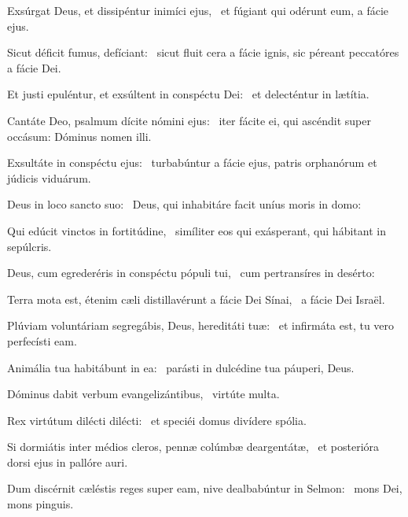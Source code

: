 \item Exsúrgat Deus, et dissipéntur inimíci ejus,~\psstar{} et fúgiant qui odérunt eum, a fácie ejus.

\item Sicut déficit fumus, defíciant:~\psstar{} sicut fluit cera a fácie ignis, sic péreant peccatóres a fácie Dei.

\item Et justi epuléntur, et exsúltent in conspéctu Dei:~\psstar{} et delecténtur in lætítia.

\item Cantáte Deo, psalmum dícite nómini ejus:~\psstar{} iter fácite ei, qui ascéndit super occásum: Dóminus nomen illi.

\item Exsultáte in conspéctu ejus:~\psstar{} turbabúntur a fácie ejus, patris orphanórum et júdicis viduárum.

\item Deus in loco sancto suo:~\psstar{} Deus, qui inhabitáre facit uníus moris in domo:

\item Qui edúcit vinctos in fortitúdine,~\psstar{} simíliter eos qui exásperant, qui hábitant in sepúlcris.

\item Deus, cum egrederéris in conspéctu pópuli tui,~\psstar{} cum pertransíres in desérto:

\item Terra mota est, étenim cæli distillavérunt a fácie Dei Sínai,~\psstar{} a fácie Dei Israël.

\item Plúviam voluntáriam segregábis, Deus, hereditáti tuæ:~\psstar{} et infirmáta est, tu vero perfecísti eam.

\item Animália tua habitábunt in ea:~\psstar{} parásti in dulcédine tua páuperi, Deus.

\item Dóminus dabit verbum evangelizántibus,~\psstar{} virtúte multa.

\item Rex virtútum dilécti dilécti:~\psstar{} et speciéi domus divídere spólia.

\item Si dormiátis inter médios cleros, pennæ colúmbæ deargentátæ,~\psstar{} et posterióra dorsi ejus in pallóre auri.

\item Dum discérnit cæléstis reges super eam, nive dealbabúntur in Selmon:~\psstar{} mons Dei, mons pinguis.

